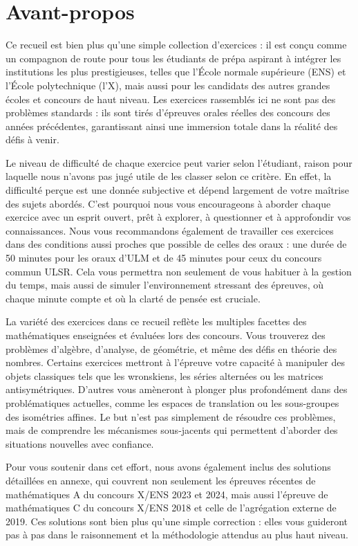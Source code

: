 \section*{Avant-propos}
Ce recueil est bien plus qu'une simple collection d'exercices : il est conçu comme un compagnon de route pour tous les étudiants de prépa aspirant à intégrer les institutions les plus prestigieuses, telles que l’École normale supérieure (ENS) et l’École polytechnique (l’X), mais aussi pour les candidats des autres grandes écoles et concours de haut niveau. Les exercices rassemblés ici ne sont pas des problèmes standards : ils sont tirés d’épreuves orales réelles des concours des années précédentes, garantissant ainsi une immersion totale dans la réalité des défis à venir.

Le niveau de difficulté de chaque exercice peut varier selon l’étudiant, raison pour laquelle nous n’avons pas jugé utile de les classer selon ce critère. En effet, la difficulté perçue est une donnée subjective et dépend largement de votre maîtrise des sujets abordés. C’est pourquoi nous vous encourageons à aborder chaque exercice avec un esprit ouvert, prêt à explorer, à questionner et à approfondir vos connaissances. Nous vous recommandons également de travailler ces exercices dans des conditions aussi proches que possible de celles des oraux : une durée de 50 minutes pour les oraux d’ULM et de 45 minutes pour ceux du concours commun ULSR. Cela vous permettra non seulement de vous habituer à la gestion du temps, mais aussi de simuler l’environnement stressant des épreuves, où chaque minute compte et où la clarté de pensée est cruciale.

La variété des exercices dans ce recueil reflète les multiples facettes des mathématiques enseignées et évaluées lors des concours. Vous trouverez des problèmes d’algèbre, d’analyse, de géométrie, et même des défis en théorie des nombres. Certains exercices mettront à l’épreuve votre capacité à manipuler des objets classiques tels que les wronskiens, les séries alternées ou les matrices antisymétriques. D’autres vous amèneront à plonger plus profondément dans des problématiques actuelles, comme les espaces de translation ou les sous-groupes des isométries affines. Le but n’est pas simplement de résoudre ces problèmes, mais de comprendre les mécanismes sous-jacents qui permettent d’aborder des situations nouvelles avec confiance.

Pour vous soutenir dans cet effort, nous avons également inclus des solutions détaillées en annexe, qui couvrent non seulement les épreuves récentes de mathématiques A du concours X/ENS 2023 et 2024, mais aussi l’épreuve de mathématiques C du concours X/ENS 2018 et celle de l’agrégation externe de 2019. Ces solutions sont bien plus qu’une simple correction : elles vous guideront pas à pas dans le raisonnement et la méthodologie attendus au plus haut niveau.

